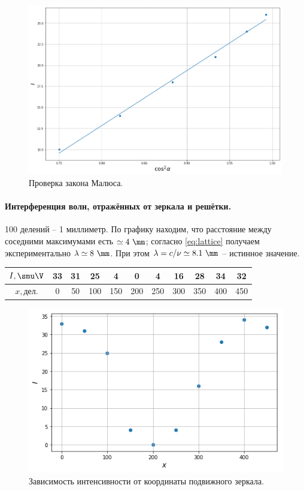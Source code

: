 \documentclass{../lab_class}
\begin{document}
\begin{figure}[H]
	\centering
	\includegraphics[width = 0.75 \textwidth]{pic01.png}
	\caption{Проверка закона Малюса.}
\end{figure}

\paragraph{Интерференция волн, отражённых от зеркала и решётки.}

100 делений -- 1 миллиметр. По графику находим, что расстояние между соседними максимумами есть $\simeq 4 \ \mm$;  согласно \ref{eq:lattice}  получаем экспериментально $\lambda \simeq 8 \ \mm$. При этом $\lambda = c / \nu \simeq 8.1 \ \mm$ -- истинное значение.

\begin{center}
	\begin{tabular}{|c|c|c|c|c|c|c|c|c|c|c|}
		\hline
		$I, \smu \V$ & 33 & 31 & 25 & 4 & 0 & 4 & 16 & 28 & 34 & 32 \\ \hline
		$x, \text{дел.}$ & 0 & 50 & 100 & 150 & 200 & 250 & 300 & 350 & 400 & 450 \\ \hline
	\end{tabular}
\end{center}

\begin{figure}[H]
	\centering
	\includegraphics[width = 0.75 \textwidth]{pic02.png}
	\caption{Зависимость интенсивности от координаты подвижного зеркала.}
\end{figure}
\end{document}

